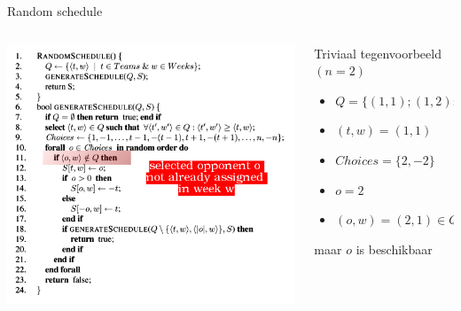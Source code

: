 \documentclass{beamer}
\begin{document}
\begin{frame}{Random schedule}

\begin{columns}[T]
\begin{column}{0.5\textwidth}
  \includegraphics[width=\textwidth]{randomscheduleALG_phixr2}
\end{column}

\begin{column}{0.5\textwidth}
\begin{exampleblock}{Triviaal tegenvoorbeeld $(n=2)$}
 \scriptsize{\begin{itemize}
  \item $Q = \{(1,1);(1,2);(2,1);(2,2)\}$
  \item $(t,w) = (1,1)$
  \item $Choices = \{2,-2\}$
  \item $o = 2 $
  \item $(o,w) = (2,1) \in Q$ 
 \end{itemize}}

\end{exampleblock}\pause
\alert{maar $o$ is beschikbaar}
\end{column}

\end{columns}
\end{frame}
\end{document}
